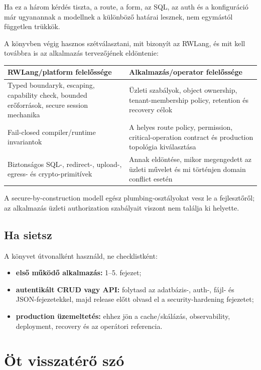 Ha ez a három kérdés tiszta, a route, a form, az SQL, az auth és a konfiguráció már ugyanannak a modellnek a különböző határai lesznek, nem egymástól független trükkök.

A könyvben végig hasznos szétválasztani, mit bizonyít az RWLang, és mit kell továbbra is az alkalmazás tervezőjének eldöntenie:

\begin{center}
\begin{tabularx}{\textwidth}{@{}Y Y@{}}
\toprule
\textbf{RWLang/platform felelőssége} & \textbf{Alkalmazás/operator felelőssége} \\
\midrule
Typed boundaryk, escaping, capability check, bounded erőforrások, secure session mechanika & Üzleti szabályok, object ownership, tenant-membership policy, retention és recovery célok \\
Fail-closed compiler/runtime invariantok & A helyes route policy, permission, critical-operation contract és production topológia kiválasztása \\
Biztonságos SQL-, redirect-, upload-, egress- és crypto-primitívek & Annak eldöntése, mikor megengedett az üzleti művelet és mi történjen domain conflict esetén \\
\bottomrule
\end{tabularx}
\end{center}

A secure-by-construction modell egész plumbing-osztályokat vesz le a fejlesztőről; az alkalmazás üzleti authorization szabályait viszont nem találja ki helyette.

\subsection*{Ha sietsz}

A könyvet útvonalként használd, ne checklistként:

\begin{itemize}
  \item \textbf{első működő alkalmazás:} 1--5. fejezet;
  \item \textbf{autentikált CRUD vagy API:} folytasd az adatbázis-, auth-, fájl- és JSON-fejezetekkel, majd release előtt olvasd el a security-hardening fejezetet;
  \item \textbf{production üzemeltetés:} ehhez jön a cache/skálázás, observability, deployment, recovery és az operátori referencia.
\end{itemize}

\section*{Öt visszatérő szó}

